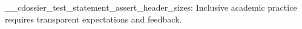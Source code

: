\documentclass[type=diversity]{careerdossier-statement}
\begin{document}
\MakeCDossierStatementHeader
\ExplSyntaxOn
\__cdossier_test_statement_assert_header_sizes:
\ExplSyntaxOff
Inclusive academic practice requires transparent expectations and feedback.
\end{document}
